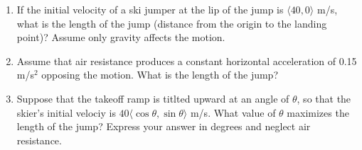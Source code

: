 \documentclass[%
]{article}
\newcommand{\vect}[1]{\mathbf{#1}}
\begin{document}
\begin{enumerate}
\begin{enumerate}
	\item If the initial velocity of a ski jumper at the lip of the jump is $\langle 40,0\rangle$ m/s, what is the length of the jump (distance from the origin to the landing point)?  Assume only gravity affects the motion.
	\item Assume that air resistance produces a constant horizontal acceleration of 0.15 m/s$^2$ opposing the motion.  What is the length of the jump?
	\item Suppose that the takeoff ramp is titlted upward at an angle of $\theta$, so that the skier's initial velociy is $40\langle \cos{\theta},\sin{\theta}\rangle$ m/s.  What value of $\theta$ maximizes the length of the jump?  Express your answer in degrees and neglect air resistance.
\end{enumerate}



\end{enumerate}
\end{document}
